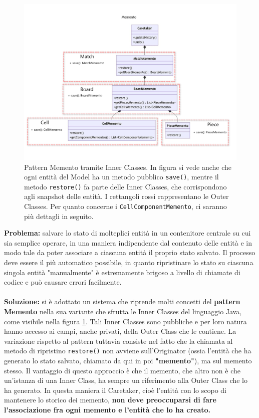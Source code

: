 \documentclass[a4paper,12pt]{report}
\begin{document}
\begin{figure}[H]
	\centering
	\includegraphics[width=\textwidth]{images/memento.png}
	\caption{Pattern Memento tramite Inner Classes. In figura si vede anche che ogni entità del Model ha un metodo pubblico \texttt{save()}, mentre il metodo \texttt{restore()} fa parte delle Inner Classes, che corrispondono agli snapshot delle entità. I rettangoli rossi rappresentano le Outer Classes. Per quanto concerne i \texttt{CellComponentMemento}, ci saranno più dettagli in seguito.}
	\label{images:memento}
\end{figure}

\textbf{Problema:} salvare lo stato di molteplici entità in un contenitore centrale su cui sia semplice operare, in una maniera indipendente dal contenuto delle entità e in modo tale da poter associare a ciascuna entità il proprio stato salvato. Il processo deve essere il più automatico possibile, in quanto ripristinare lo stato su ciascuna singola entità "manualmente" è estremamente brigoso a livello di chiamate di codice e può causare errori facilmente.
\\\\
\textbf{Soluzione:} si è adottato un sistema che riprende molti concetti del \textbf{pattern Memento} nella sua variante che sfrutta le Inner Classes del linguaggio Java, come visibile nella figura \ref{images:memento}. Tali Inner Classes sono pubbliche e per loro natura hanno accesso ai campi, anche privati, della Outer Class che le contiene. La variazione rispetto al pattern tuttavia consiste nel fatto che la chiamata al metodo di ripristino \texttt{restore()} non avviene sull'Originator (ossia l'entità che ha generato lo stato salvato, chiamato da qui in poi \textbf{"memento"}), ma sul memento stesso. Il vantaggio di questo approccio è che il memento, che altro non è che un'istanza di una Inner Class, ha sempre un riferimento alla Outer Class che lo ha generato. In questa maniera il Caretaker, cioè l'entità con lo scopo di mantenere lo storico dei memento, \textbf{non deve preoccuparsi di fare l'associazione fra ogni memento e l'entità che lo ha creato.}
\end{document}
